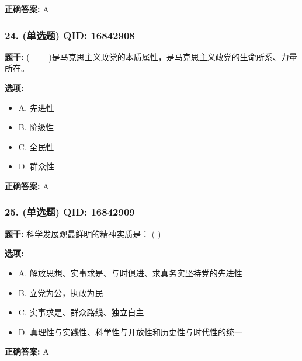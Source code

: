 \documentclass[12pt,UTF8]{ctexart}
\begin{document}
\textbf{正确答案:}
A

\vspace{0.3em}\hrulefill\vspace{0.7em}

\subsubsection*{24. (单选题) \small QID: 16842908}

\textbf{题干:}
(     )是马克思主义政党的本质属性，是马克思主义政党的生命所系、力量所在。

\textbf{选项:}
\begin{itemize}[leftmargin=*]

  \item A. 先进性

  \item B. 阶级性

  \item C. 全民性

  \item D. 群众性

\end{itemize}

\textbf{正确答案:}
A

\vspace{0.3em}\hrulefill\vspace{0.7em}

\subsubsection*{25. (单选题) \small QID: 16842909}

\textbf{题干:}
科学发展观最鲜明的精神实质是： ( )

\textbf{选项:}
\begin{itemize}[leftmargin=*]

  \item A. 解放思想、实事求是、与时俱进、求真务实坚持党的先进性

  \item B. 立党为公，执政为民

  \item C. 实事求是、群众路线、独立自主

  \item D. 真理性与实践性、科学性与开放性和历史性与时代性的统一

\end{itemize}

\textbf{正确答案:}
A

\vspace{0.3em}\hrulefill\vspace{0.7em}
\end{document}
